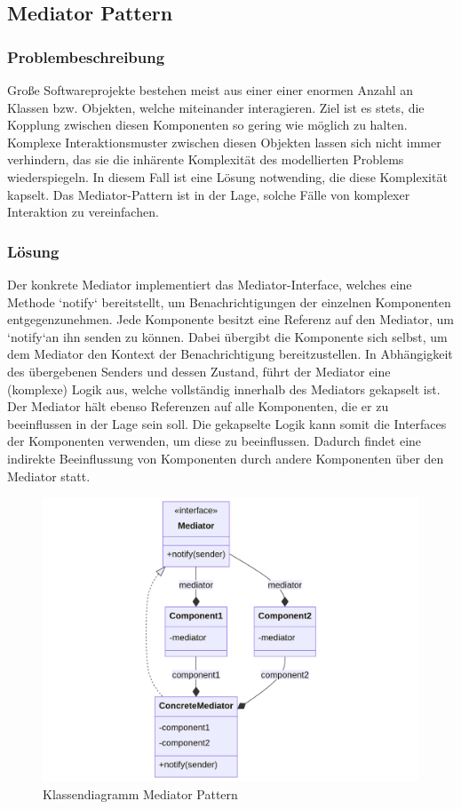 \subsection{Mediator Pattern}


\subsubsection*{Problembeschreibung}

Große Softwareprojekte bestehen meist aus einer einer enormen Anzahl an Klassen bzw. Objekten, welche miteinander interagieren. Ziel ist es stets, die Kopplung zwischen diesen Komponenten so gering wie möglich zu halten. Komplexe Interaktionsmuster zwischen diesen Objekten lassen sich nicht immer verhindern, das sie die inhärente Komplexität des modellierten Problems wiederspiegeln. In diesem Fall ist eine Lösung notwending, die diese Komplexität kapselt. Das Mediator-Pattern ist in der Lage, solche Fälle von komplexer Interaktion zu vereinfachen.

\subsubsection*{Lösung}

Der konkrete Mediator implementiert das Mediator-Interface, welches eine Methode `notify` bereitstellt, um Benachrichtigungen der einzelnen Komponenten entgegenzunehmen. Jede Komponente besitzt eine Referenz auf den Mediator, um `notify`an ihn senden zu können. Dabei übergibt die Komponente sich selbst, um dem Mediator den Kontext der Benachrichtigung bereitzustellen. In Abhängigkeit des übergebenen Senders und dessen Zustand, führt der Mediator eine (komplexe) Logik aus, welche vollständig innerhalb des Mediators gekapselt ist. Der Mediator hält ebenso Referenzen auf alle Komponenten, die er zu beeinflussen in der Lage sein soll. Die gekapselte Logik kann somit die Interfaces der Komponenten verwenden, um diese zu beeinflussen. Dadurch findet eine indirekte Beeinflussung von Komponenten durch andere Komponenten über den Mediator statt.  

\begin{figure}[!hb]
	\centering
	\includegraphics[width=0.75\linewidth]{images/patterns/mediator-class.png}
	\caption{Klassendiagramm Mediator Pattern}
	\label{fig:mediator-class}
\end{figure}


